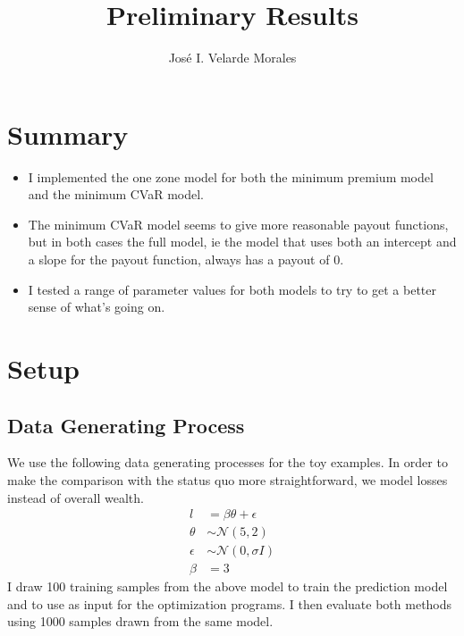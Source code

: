 \documentclass[11pt]{article}
\title{Preliminary Results}
\author{José I. Velarde Morales}
\begin{document}
\maketitle

\section{Summary}
\begin{itemize}
    \item I implemented the one zone model for both the minimum premium model and the minimum CVaR model. 
    \item The minimum CVaR model seems to give more reasonable payout functions, but in both cases the full model, ie the model that uses both an intercept and a slope for the payout function, always has a payout of 0. 
    \item I tested a range of parameter values for both models to try to get a better sense of what's going on. 
\end{itemize}

\section{Setup}
    \subsection*{Data Generating Process}
    We use the following data generating processes for the toy examples. In order to make the comparison with the status quo more straightforward, we model losses instead of overall wealth. 
    \begin{align*}
        l&=\beta \theta + \epsilon\\
        \theta &\sim \mathcal{N}(5,2)\\
        \epsilon &\sim \mathcal{N}(0,\sigma I)\\
        \beta &= 3
    \end{align*}
    I draw 100 training samples from the above model to train the prediction model and to use as input for the optimization programs. I then evaluate both methods using 1000 samples drawn from the same model. 
\end{document}
